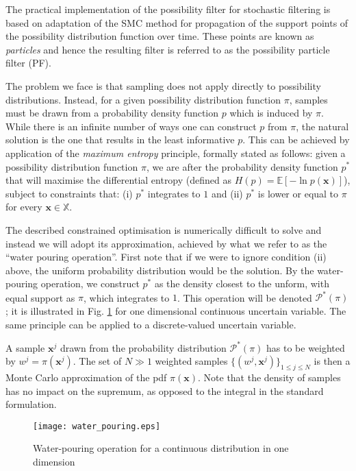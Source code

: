 \documentclass{llncs}
\newcommand{\xb}{\mathbf{x}}
\begin{document}
The practical implementation of the possibility filter for stochastic filtering is based on adaptation of the SMC method for propagation of the support points of the possibility distribution function over time. These points are known as {\em particles} and hence the resulting filter is referred to as the possibility particle filter (PF).

The problem we face is that sampling does not apply directly to possibility distributions. Instead, for a given possibility distribution function $\pi$, samples must be drawn from a probability density function $p$ which is induced by $\pi$. While there is an infinite number of ways one can construct $p$ from $\pi$, the natural solution is the one that results in the least informative $p$. This can be achieved by application of the  {\em maximum entropy} principle, formally stated as follows:  given a possibility distribution function $\pi$, we are after the probability density function $p^*$ that will maximise the differential entropy (defined as $H(p) = \mathbb{E}[-\ln p(\xb)]$), subject to constraints that: (i) $p^*$ integrates to $1$ and (ii) $p^*$ is lower or equal to $\pi$ for every $\xb\in\mathbb{X}$.

The described constrained optimisation is numerically difficult to solve and instead we will adopt its approximation, achieved by what we refer to as the ``water pouring operation''. First note that if we were to ignore condition (ii) above, the uniform probability distribution would be the solution. By the water-pouring operation, we construct $p^*$ as the density closest to the unform, with equal support as $\pi$, which integrates to $1$. This operation will be denoted $\mathcal{P}^*(\pi)$; it is illustrated in Fig. \ref{f:1} for one dimensional continuous uncertain variable. The same principle can be applied to a discrete-valued uncertain variable.

A sample $\xb^j$ drawn from the probability distribution $\mathcal{P}^*(\pi)$ has to be weighted by $w^j=\pi(\xb^j)$. The set of $N\gg 1$ weighted samples $ \{(w^j,\xb^j)\}_{1\leq j\leq N}$ is then a Monte Carlo approximation of the pdf $\pi(\xb)$. Note that the density of samples has no impact on the supremum, as opposed to the integral in the standard formulation.

 \begin{figure}[tbh]
\centerline{\texttt{[image: water\_pouring.eps]}}
\caption{Water-pouring operation for a continuous distribution in one dimension} \label{f:1}
\end{figure}
\end{document}
